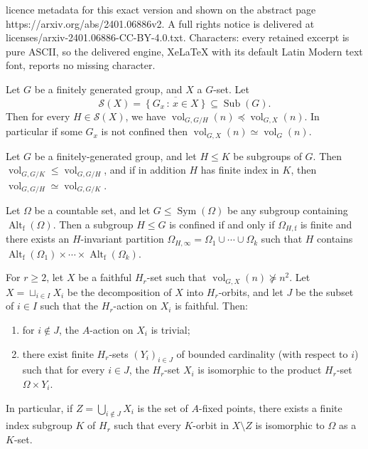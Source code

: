 \documentclass[10pt,a4paper]{amsart}
\newcommand{\Alt}{\ensuremath{\operatorname{Alt}}}%
\newcommand{\Sym}{\ensuremath{\operatorname{Sym}}}%
\newcommand{\sub}{\ensuremath{\operatorname{Sub}}}%
\newcommand{\vol}{\ensuremath{\operatorname{vol}}}%
\begin{document}
licence metadata for this exact version and shown on the abstract page https://arxiv.org/abs/2401.06886v2. A full rights notice is delivered at licenses/arxiv-2401.06886-CC-BY-4.0.txt. Characters: every retained excerpt is pure ASCII, so the delivered engine, XeLaTeX with its default Latin Modern text font, reports no missing character.
\begin{lem}\label{lem:SmallGrowthConfined}
Let $G$ be a finitely generated group, and $X$ a $G$-set. Let \[ \mathcal{S}(X) = \overline{ \left\lbrace G_x  \, : \, x \in X \right\rbrace } \subseteq \sub(G). \] Then for every $H \in \mathcal{S}(X)$, we have $\vol_{G, G/H}(n) \preccurlyeq \vol_{G, X}(n)$. In particular if some $G_x$ is not confined then $\vol_{G,X}(n) \simeq \vol_G(n)$. 
\end{lem}

\begin{lem}
	\label{lem:FiniteIndex}
	Let $G$ be a finitely-generated group, and let $H \leq K$ be subgroups of $G$. Then $\vol_{G, G/K} \le \vol_{G, G/H}$, and if in addition $H$ has finite index in $K$, then $\vol_{G, G/H} \simeq \vol_{G, G/K}$.
\end{lem}

\begin{prop}\label{p-confined-partially-finitary}
Let $\Omega$ be a countable set, and let $G \leq \Sym(\Omega)$ be any subgroup containing $\Alt_{\mathrm{f}}(\Omega)$.  Then a subgroup $H\le G$ is confined if and only if $\Omega_{H, \mathrm{f}}$ is finite and there exists an $H$-invariant partition $\Omega_{H,\infty} = \Omega_1 \cup \cdots \cup \Omega_k$ such that $H$ contains $\Alt_{\mathrm{f}}(\Omega_1) \times \cdots \times \Alt_{\mathrm{f}}(\Omega_k)$.
\end{prop}

\begin{prop} \label{p-Houghton}
For $r \ge 2$, let $X$ be a faithful $H_r$-set such that $\vol_{G, X}(n) \not \succeq n^2$. Let $X=\sqcup_{i \in I} X_i$ be the decomposition of $X$ into  $H_r$-orbits, and let $J$ be the subset of $i\in I$ such that the $H_r$-action on $X_i$ is  faithful.
Then:
\begin{enumerate}
\item \label{i-A-trivial} for $i\notin J$, the $A$-action on $X_i$ is trivial;
\item \label{i-A-non-trivial} there exist finite  $H_r$-sets $(Y_i)_{i\in J}$ of bounded cardinality (with respect to $i$) such that for every $i\in J$, the $H_r$-set $X_i$ is isomorphic to the product $H_r$-set $\Omega\times Y_i$.


\end{enumerate}
In particular, if $Z=\bigcup_{i\notin J} X_i$ is the set of $A$-fixed points, there exists a finite index subgroup $K$ of $H_r$ such that every $K$-orbit in $X\setminus Z$ is isomorphic to $\Omega$ as a $K$-set.
\end{prop}
\end{document}
